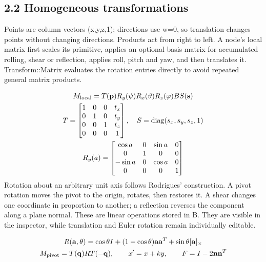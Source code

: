 \documentclass[12pt,a4paper]{article}
\begin{document}
\subsection*{2.2 Homogeneous transformations}
Points are column vectors (x,y,z,1); directions use w=0, so translation changes points without changing directions. Products act from right to left. A node's local matrix first scales its primitive, applies an optional basis matrix for accumulated rolling, shear or reflection, applies roll, pitch and yaw, and then translates it. Transform::Matrix evaluates the rotation entries directly to avoid repeated general matrix products.

{\small\begin{equation}\begin{gathered}
M_{\rm local}=T(\mathbf p)R_y(\psi)R_x(\vartheta)R_z(\varphi)BS(\mathbf s)\\
T=\begin{bmatrix}1&0&0&t_x\\0&1&0&t_y\\0&0&1&t_z\\0&0&0&1\end{bmatrix},\quad
S=\operatorname{diag}(s_x,s_y,s_z,1)\\
R_y(a)=\begin{bmatrix}\cos a&0&\sin a&0\\0&1&0&0\\-\sin a&0&\cos a&0\\0&0&0&1\end{bmatrix}
\end{gathered}\label{eq:4}\end{equation}}
Rotation about an arbitrary unit axis follows Rodrigues' construction. A pivot rotation moves the pivot to the origin, rotates, then restores it. A shear changes one coordinate in proportion to another; a reflection reverses the component along a plane normal. These are linear operations stored in B. They are visible in the inspector, while translation and Euler rotation remain individually editable.

{\small\begin{equation}\begin{gathered}
R(\mathbf a,\theta)=\cos\theta I+(1-\cos\theta)\mathbf a\mathbf a^T+\sin\theta[\mathbf a]_\times\\
M_{\rm pivot}=T(\mathbf q)RT(-\mathbf q),\qquad x'=x+ky,\qquad F=I-2\mathbf n\mathbf n^T
\end{gathered}\label{eq:5}\end{equation}}
\end{document}
